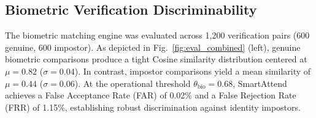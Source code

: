 \documentclass[conference]{IEEEtran}
\begin{document}
\begin{table}[h]
\centering
\caption{Processing Latency Breakdown by Verification Stage}
\label{tab:latency_breakdown}
\end{table}

\subsection{Biometric Verification Discriminability}
The biometric matching engine was evaluated across 1,200 verification pairs (600 genuine, 600 impostor). As depicted in Fig.~\ref{fig:eval_combined} (left), genuine biometric comparisons produce a tight Cosine similarity distribution centered at $\mu = 0.82$ ($\sigma = 0.04$). In contrast, impostor comparisons yield a mean similarity of $\mu = 0.44$ ($\sigma = 0.06$). At the operational threshold $\theta_{\text{bio}} = 0.68$, SmartAttend achieves a False Acceptance Rate (FAR) of 0.02\% and a False Rejection Rate (FRR) of 1.15\%, establishing robust discrimination against identity impostors.
\end{document}

